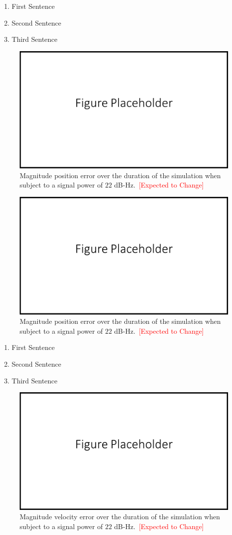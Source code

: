 \begin{enumerate}
    \item First Sentence
    \item Second Sentence
    \item Third Sentence
\end{enumerate}

\begin{figure}[!ht]
    \centering
    \includegraphics[width=0.5\linewidth]{Figures/FigurePlaceholder.png}
    \caption{Magnitude position error over the duration of the simulation when subject to a signal power of \(22\) dB-Hz.~\textcolor{red}{[Expected to Change]}}\label{fig:positionerror451}
\end{figure}

\begin{figure}[!ht]
    \centering
    \includegraphics[width=0.5\linewidth]{Figures/FigurePlaceholder.png}
    \caption{Magnitude position error over the duration of the simulation when subject to a signal power of \(22\) dB-Hz.~\textcolor{red}{[Expected to Change]}}\label{fig:positionerror221}
\end{figure}

\begin{enumerate}
    \item First Sentence
    \item Second Sentence
    \item Third Sentence
\end{enumerate}

\begin{figure}[!ht]
    \centering
    \includegraphics[width=0.5\linewidth]{Figures/FigurePlaceholder.png}
    \caption{Magnitude velocity error over the duration of the simulation when subject to a signal power of \(22\) dB-Hz.~\textcolor{red}{[Expected to Change]}}\label{fig:velocityerror451}
\end{figure}


